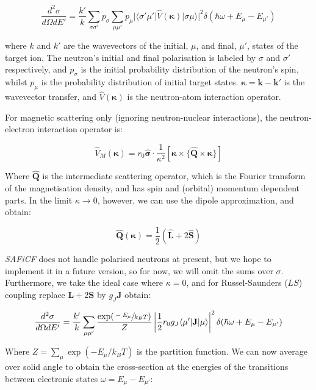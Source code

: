 \documentclass[12pt,onecolumn,tightenlines,aps,amsmath,floatfix,notitlepage,nofootinbib]{revtex4}
\newcommand{\V}[1]{\mathbf{#1}}
\newcommand{\bra}[1]{\langle #1|}
\newcommand{\ket}[1]{|#1\rangle}
\begin{document}
\begin{equation} \label{eq:ddxs}
\frac{d^2 \sigma}{d\Omega dE'} = \frac{k'}{k} \sum_{\sigma \sigma'} p_\sigma \sum_{\mu \mu'} p_\mu |\bra{\sigma' \mu'}\hat{V}(\V{\kappa})\ket{\sigma \mu}|^2 \delta(\hbar \omega + E_\mu - E_{\mu'})
\end{equation}

\noindent where $k$ and $k'$ are the wavevectors  of the initial, $\mu$, and final, $\mu'$, states of the target ion. The neutron's initial and final polarisation is labeled by $\sigma$ and $\sigma'$ respectively, and $p_\sigma$ is the initial probability distribution of the neutron's spin, whilst $p_\mu$ is the probability distribution of initial target states. $\V{\kappa}=\V{k}-\V{k}'$ is the wavevector transfer, and $\hat{V}(\V{\kappa})$ is the neutron-atom interaction operator.

For magnetic scattering only (ignoring neutron-nuclear interactions), the neutron-electron interaction operator is:

\begin{equation} \label{eq:neop}
\hat{V}_M(\V{\kappa}) = r_0 \hat{\V{\sigma}} \cdot \frac{1}{\kappa^2} [ \V{\kappa} \times \{\hat{\V{Q}} \times \V{\kappa} \} ]
\end{equation}

\noindent Where $\hat{\V{Q}}$ is the intermediate scattering operator, which is the Fourier transform of the magnetisation density, and has spin and (orbital) momentum dependent parts. In the limit $\kappa \rightarrow 0$, however, we can use the dipole approximation, and obtain:

\begin{equation} \label{eq:Qdipole}
\hat{\V{Q}}(\V{\kappa}) = \frac{1}{2} \left( \hat{\V{L}} + 2\hat{\V{S}} \right)
\end{equation}

\emph{SAFiCF} does not handle polarised neutrons at present, but we hope to implement it in a future version, so for now, we will omit the sums over $\sigma$. Furthermore, we take the ideal case where $\kappa = 0$, and for Russel-Saunders ($LS$) coupling replace $\V{L}+2\V{S}$ by $g_J\V{J}$ obtain:

\[ \frac{d^2 \sigma}{d\Omega dE'} = \frac{k'}{k} \sum_{\mu \mu'} \frac{\exp(\sfrac{-E_\mu}{k_B T})}{Z} \left| \frac{1}{2}r_0 g_J \bra{\mu'}\V{J}\ket{\mu} \right|^2 \delta(\hbar \omega + E_\mu - E_{\mu'}) \]

\noindent Where $Z = \sum_\mu \exp(-E_\mu/k_B T)$ is the partition function. We can now average over solid angle to obtain the cross-section at the energies of the transitions between electronic states $\omega = E_\mu-E_{\mu'}$:
\end{document}
